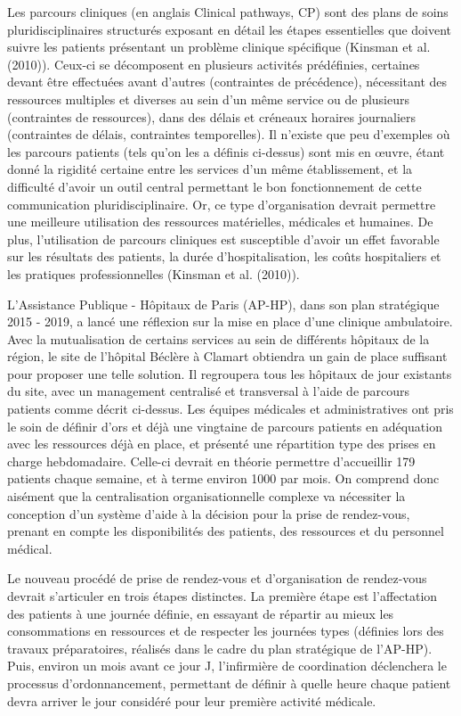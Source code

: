 \documentclass{polytech/polytech}
\begin{document}
Les parcours cliniques (en anglais Clinical pathways, CP) sont des plans de soins pluridisciplinaires structurés exposant en détail les étapes essentielles que doivent suivre les patients présentant un problème clinique spécifique (Kinsman et al. (2010)). Ceux-ci se décomposent en plusieurs activités prédéfinies, certaines devant être effectuées avant d'autres (contraintes de précédence), nécessitant des ressources multiples et diverses au sein d'un même service ou de plusieurs (contraintes de ressources), dans des délais et créneaux horaires journaliers (contraintes de délais, contraintes temporelles). Il n'existe que peu d'exemples où les parcours patients (tels qu'on les a définis ci-dessus) sont mis en œuvre, étant donné la rigidité certaine entre les services d'un même établissement, et la difficulté d'avoir un outil central permettant le bon fonctionnement de cette communication pluridisciplinaire. Or, ce type d'organisation devrait permettre une meilleure utilisation des ressources matérielles, médicales et humaines. De plus, l'utilisation de parcours cliniques est susceptible d'avoir un effet favorable sur les résultats des patients, la durée d'hospitalisation, les coûts hospitaliers et les pratiques professionnelles (Kinsman et al. (2010)).

L'Assistance Publique - Hôpitaux de Paris (AP-HP), dans son plan stratégique 2015 - 2019, a lancé une réflexion sur la mise en place d'une clinique ambulatoire. Avec la mutualisation de certains services au sein de différents hôpitaux de la région, le site de l'hôpital Béclère à Clamart obtiendra un gain de place suffisant pour proposer une telle solution. Il regroupera tous les hôpitaux de jour existants du site, avec un management centralisé et transversal à l’aide de parcours patients comme décrit ci-dessus. Les équipes médicales et administratives ont pris le soin de définir d’ors et déjà une vingtaine de parcours patients en adéquation avec les ressources déjà en place, et présenté une répartition type des prises en charge hebdomadaire. Celle-ci devrait en théorie permettre d'accueillir 179 patients chaque semaine, et à terme environ 1000 par mois. On comprend donc aisément que la centralisation organisationnelle complexe va nécessiter la conception d'un système d'aide à la décision pour la prise de rendez-vous, prenant en compte les disponibilités des patients, des ressources et du personnel médical.

Le nouveau procédé de prise de rendez-vous et d'organisation de rendez-vous devrait s'articuler en trois étapes distinctes. La première étape est l'affectation des patients à une journée définie, en essayant de répartir au mieux les consommations en ressources et de respecter les journées types (définies lors des travaux préparatoires, réalisés dans le cadre du plan stratégique de l'AP-HP). Puis, environ un mois avant ce jour J, l'infirmière de coordination déclenchera le processus d'ordonnancement, permettant de définir à quelle heure chaque patient devra arriver le jour considéré pour leur première activité médicale.
\end{document}
